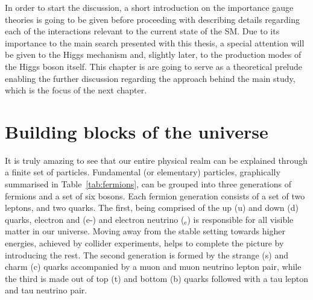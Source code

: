 \hspace{10pt} In order to start the discussion, a short introduction on the importance gauge theories is going to be given before proceeding with describing details regarding each of the interactions relevant to the current state of the SM. Due to its importance to the main search presented with this thesis, a special attention will be given to the Higgs mechanism and, slightly later, to the production modes of the Higgs boson itself. This chapter is are going to serve as a theoretical prelude enabling the further discussion regarding the approach behind the main study, which is the focus of the next chapter.
\newpage
\section{Building blocks of the universe}
\hspace{10pt} It is truly amazing to see that our entire physical realm can be explained through a finite set of particles. Fundamental (or elementary) particles, graphically summarised in Table~\ref{tab:fermions}, can be grouped into three generations of fermions and a set of six bosons. Each fermion generation consists of a set of two leptons, and two quarks. The first, being comprised of the up (u) and down (d) quarks, electron and (e-) and electron neutrino (\textnu$_\text{e}$) is responsible for all visible matter in our universe. Moving away from the stable setting towards higher energies, achieved by collider experiments, helps to complete the picture by introducing the rest. The second generation is formed by the strange (s) and charm (c) quarks accompanied by a muon and muon neutrino lepton pair, while the third is made out of top (t) and bottom (b) quarks followed with a tau lepton and tau neutrino pair.

